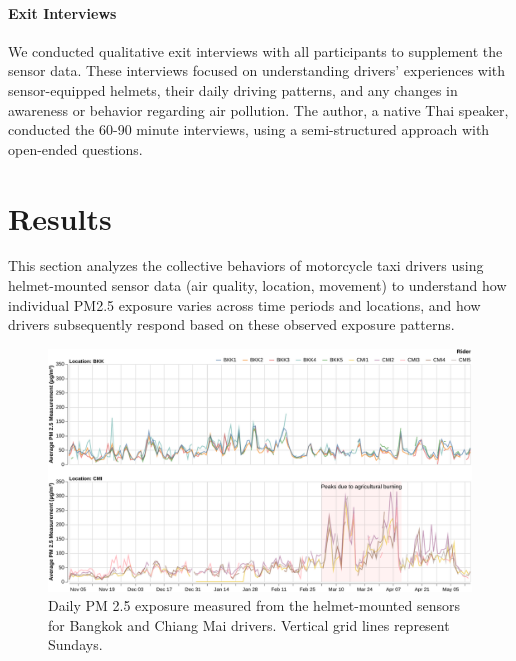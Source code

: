 \documentclass[sigconf,screen,natbib=true]{acmart}
\providecommand{\DIFaddbegin}{} %
\providecommand{\DIFaddend}{} %
\begin{document}
\DIFaddbegin {}





\DIFaddend \paragraph{Exit Interviews}
We conducted qualitative exit interviews with all participants to supplement the sensor data. 
These interviews focused on understanding drivers' experiences with sensor-equipped helmets, their daily driving patterns, and any changes in awareness or behavior regarding air pollution. 
The author, a native Thai speaker, conducted the 60-90 minute interviews, using a semi-structured approach with open-ended questions.  \section{Results}


This section analyzes the collective behaviors of motorcycle taxi drivers using helmet-mounted sensor data (air quality, location, movement) to understand how individual PM2.5 exposure varies across time periods and locations, and how drivers subsequently respond based on these observed exposure patterns.

\begin{figure}
    \centering
    \includegraphics[width=\textwidth]{figures/daily-pollution-per-rider.pdf}
    \caption{
    Daily PM 2.5 exposure measured from the helmet-mounted sensors for Bangkok and Chiang Mai drivers.
    Vertical grid lines represent Sundays.
    }
    \Description{}
    \label{fig:daily-pollution-per-driver}
\end{figure}
\end{document}
